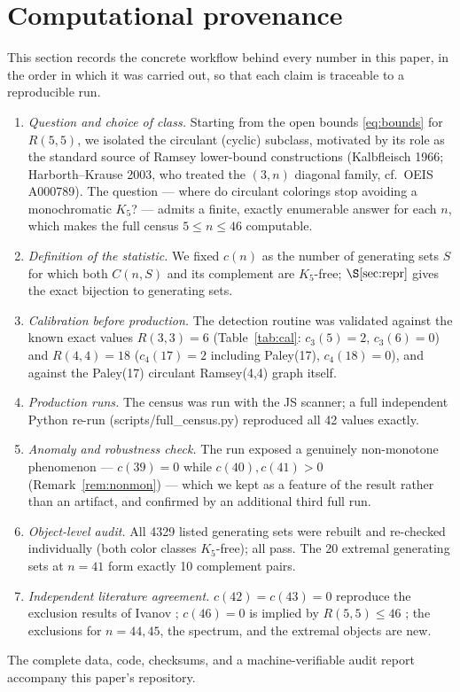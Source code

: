 \documentclass[11pt]{article}
\theoremstyle{remark}
\begin{document}
\section{Computational provenance}\label{sec:prov}
This section records the concrete workflow behind every number in this paper, in the order
in which it was carried out, so that each claim is traceable to a reproducible run.
\begin{enumerate}
\item \emph{Question and choice of class.} Starting from the open bounds
\eqref{eq:bounds} for $R(5,5)$, we isolated the circulant (cyclic) subclass, motivated by
its role as the standard source of Ramsey lower-bound constructions (Kalbfleisch 1966;
Harborth--Krause 2003, who treated the $(3,n)$ diagonal family, cf.\ OEIS A000789). The
question --- where do circulant colorings stop avoiding a monochromatic $K_5$? --- admits
a finite, exactly enumerable answer for each $n$, which makes the full census $5\le n\le46$
computable.
\item \emph{Definition of the statistic.} We fixed $c(n)$ as the number of generating sets
$S$ for which both $C(n,S)$ and its complement are $K_5$-free;
$\S\ref{sec:repr}$ gives the exact bijection to generating sets.
\item \emph{Calibration before production.} The detection routine was validated against
the known exact values $R(3,3)=6$ (Table~\ref{tab:cal}: $c_3(5)=2$, $c_3(6)=0$) and
$R(4,4)=18$ ($c_4(17)=2$ including Paley(17), $c_4(18)=0$), and against the Paley(17)
circulant Ramsey(4,4) graph itself.
\item \emph{Production runs.} The census was run with the JS scanner; a full independent
Python re-run (scripts/full\_census.py) reproduced all 42 values exactly.
\item \emph{Anomaly and robustness check.} The run exposed a genuinely non-monotone
phenomenon --- $c(39)=0$ while $c(40),c(41)>0$ (Remark~\ref{rem:nonmon}) --- which we kept
as a feature of the result rather than an artifact, and confirmed by an additional third
full run.
\item \emph{Object-level audit.} All 4329 listed generating sets were rebuilt and
re-checked individually (both color classes $K_5$-free); all pass. The 20 extremal
generating sets at $n=41$ form exactly 10 complement pairs.
\item \emph{Independent literature agreement.} $c(42)=c(43)=0$ reproduce the exclusion
results of Ivanov \cite{ivanov2026}; $c(46)=0$ is implied by $R(5,5)\le46$ \cite{am2024};
the exclusions for $n=44,45$, the spectrum, and the extremal objects are new.
\end{enumerate}
The complete data, code, checksums, and a machine-verifiable audit report accompany this
paper's repository.
\end{document}
